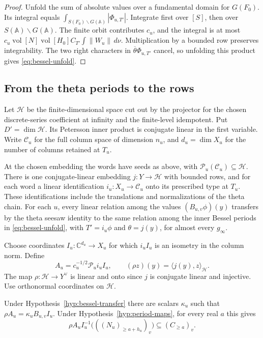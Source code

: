 \begin{proof}
Unfold the sum of absolute values over a fundamental domain for
$G(F_0)$. Its integral equals $\int_{S(F_0)\backslash G(\mathbb A)}
|\Phi_{u,T'}|$. Integrate first over $[S]$, then over
$S(\mathbb A)\backslash G(\mathbb A)$. The finite orbit contributes
$c_u$, and the integral is at most
$c_u\operatorname{vol}[N]\operatorname{vol}[H_0]C_{T'}\int\|W_u\|\,d\nu$.
Multiplication by a bounded row preserves integrability. The two right
characters in $\overline{\theta}\Phi_{u,T'}$ cancel, so unfolding this
product gives \eqref{eq:bessel-unfold}.
\end{proof}

\subsection{From the theta periods to the rows}

Let $\mathcal H$ be the finite-dimensional space cut out by the
projector for the chosen discrete-series coefficient at infinity and
the finite-level idempotent. Put $D'=\dim\mathcal H$. Its Petersson inner product is
conjugate linear in the first variable. Write $\mathcal C_u$ for the
full column space of dimension $n_u$, and $d_u=\dim X_u$ for the
number of columns retained at $T_u$.

\begin{hypothesis}[\openinput]\label{hyp:bessel-transfer}
At the chosen embedding the words have seeds as above, with
$\mathcal P_u(\mathcal C_u)\subseteq\mathcal H$. There is one
conjugate-linear embedding $j:Y\to\mathcal H$ with bounded
rows, and for each word a linear identification $i_u:X_u\to
\mathcal C_u$ onto its prescribed type at $T_u$. These identifications
include the translations and normalizations of the theta chain.
For each $u$, every linear relation among the values
$(B_{u,v}\phi)(y)$ transfers by the theta seesaw identity to the same
relation among the inner Bessel periods in \eqref{eq:bessel-unfold},
with $T'=i_u\phi$ and $\theta=j(y)$, for almost every $g_\infty$.
\end{hypothesis}

Choose coordinates $I_u:\mathbb C^{d_u}\to X_u$ for which $i_uI_u$
is an isometry in the column norm. Define
\[
 A_u=c_u^{-1/2}\mathcal P_u i_u I_u,\qquad
 (\rho z)(y)=\langle j(y),z\rangle_{\mathcal H}.
\]
The map $\rho:\mathcal H\to Y^\vee$ is linear and onto since $j$ is
conjugate linear and injective. Use orthonormal coordinates on $\mathcal H$.

\begin{proposition}\label{prop:bessel-rows}
Under Hypothesis~\ref{hyp:bessel-transfer} there are scalars $\kappa_u$
such that $\rho A_u=\kappa_u B_{u,v}I_u$. Under
Hypothesis~\ref{hyp:period-maps}, for every real $a$ this gives
\begin{equation}\label{eq:bessel-filtered-rows}
 \rho A_u I_u^{-1}\bigl(((N_u)_{\ge a+h_u})_v\bigr)
       \subseteq (C_{\ge a})_v .
\end{equation}
\end{proposition}

